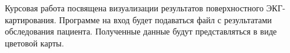 Курсовая работа посвящена визуализации результатов поверхностного ЭКГ-картирования.
Программе на вход будет подаваться файл с результатами обследования пациента.
Полученные данные будут представляться в виде цветовой карты.
